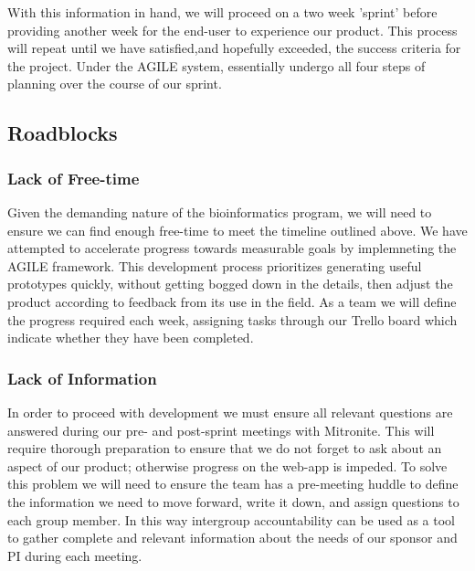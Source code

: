 \documentclass[10pt,twocolumn,letterpaper]{article}
\begin{document}
            With this information in hand, we will proceed on a two week 'sprint' before providing another week for the end-user to experience our product. This process will repeat until we have satisfied,and hopefully exceeded, the success criteria for the project. Under the AGILE system, essentially undergo all four steps of planning over the course of our sprint.

            \subsection{Roadblocks}


            \subsubsection{Lack of Free-time}
                    Given the demanding nature of the bioinformatics program, we will need to ensure we can find enough free-time to meet the timeline outlined above. We have attempted to accelerate progress towards measurable goals by implemneting the AGILE framework. This development process prioritizes generating useful prototypes quickly, without getting bogged down in the details, then adjust the product according to feedback from its use in the field. As a team we will define the progress required each week, assigning tasks through our Trello board which indicate whether they have been completed.

            \subsubsection{Lack of Information}
                    In order to proceed with development we must ensure all relevant questions are answered during our pre- and post-sprint meetings with Mitronite. This will require thorough preparation to ensure that we do not forget to ask about an aspect of our product; otherwise progress on the web-app is impeded. To solve this problem we will need to ensure the team has a pre-meeting huddle to define the information we need to move forward, write it down, and assign questions to each group member. In this way intergroup accountability can be used as a tool to gather complete and relevant information about the needs of our sponsor and PI during each meeting.
\end{document}
